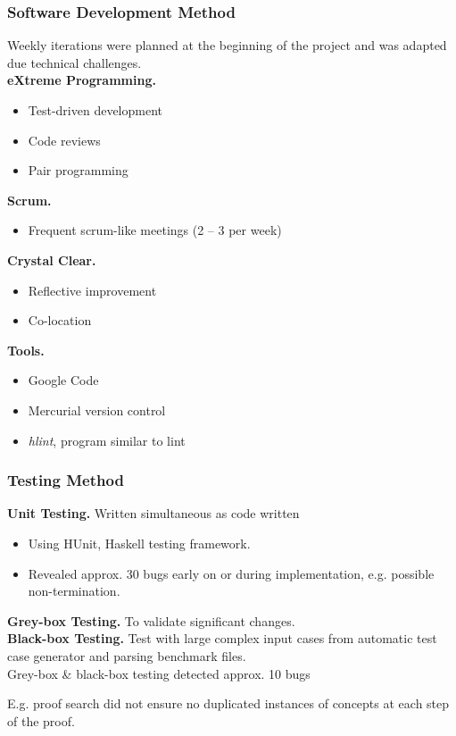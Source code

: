\begin{frame}
  \frametitle{Software Development Method}
Weekly iterations were planned at the beginning of the project and was adapted due technical challenges.\\
\smallskip
\textbf{eXtreme Programming.}
\begin{itemize}
\item Test-driven development
\item Code reviews
\item Pair programming
\end{itemize}

\textbf{Scrum.}
\begin{itemize}
\item Frequent scrum-like meetings (2 -- 3 per week)
\end{itemize}

\textbf{Crystal Clear.}
\begin{itemize}
\item Reflective improvement
\item Co-location
\end{itemize}

\textbf{Tools.}
\begin{itemize}
\item Google Code
\item Mercurial version control
\item \textit{hlint}, program similar to lint
\end{itemize}
\end{frame}


\begin{frame}
  \frametitle{Testing Method}
\textbf{Unit Testing.} Written simultaneous as code written
\begin{itemize}
\item Using HUnit, Haskell testing framework.
\item Revealed approx. 30 bugs early on or during implementation, e.g. possible non-termination.
\end{itemize}
\bigskip
\textbf{Grey-box Testing.} To validate significant changes.\\
\bigskip
\textbf{Black-box Testing.} Test with large complex input cases from automatic test case generator and parsing benchmark files.\\
\bigskip
Grey-box \& black-box testing detected approx. 10 bugs

E.g. proof search did not ensure no duplicated instances of concepts at each step of the proof.
\end{frame}

